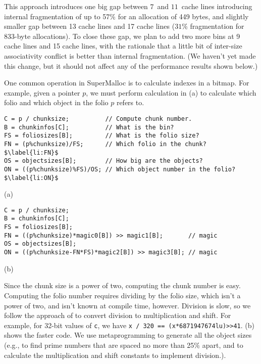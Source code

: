 \documentclass[pldi]{sigplanconf-pldi15}
\newcommand{\code}[1]{\texttt{#1}}
\begin{document}
This approach introduces one big gap between $7$~and $11$~cache lines
introducing internal fragmentation of up to 57\% for an allocation of
449 bytes, and slightly smaller gap between 13 cache lines and 17
cache lines ($31$\% fragmentation for 833-byte allocations).  To close
these gap, we plan to add two more bins at 9 cache lines and 15 cache
lines, with the rationale that a little bit of inter-size
associativity conflict is better than internal fragmentation.  (We
haven't yet made this change, but it should not affect any of the
performance results shown below.)


One common operation in SuperMalloc is to calculate indexes in a
bitmap.  For example, given a pointer $p$, we must perform calculation
in (a) to calculate which folio and which object in
the folio $p$ refers to.

\begin{figure*}
\begin{verbatim}
C = p / chunksize;          // Compute chunk number.
B = chunkinfos[C];          // What is the bin?
FS = foliosizes[B];         // What is the folio size?
FN = (p%chunksize)/FS;      // Which folio in the chunk?$\label{li:FN}$
OS = objectsizes[B];        // How big are the objects?
ON = ((p%chunksize)%FS)/OS; // Which object number in the folio?$\label{li:ON}$
\end{verbatim}
\begin{center}
(a)
\end{center}
\begin{verbatim}
C = p / chunksize;
B = chunkinfos[C];
FS = foliosizes[B];
FN = ((p%chunksize)*magic0[B]) >> magic1[B];       // magic
OS = objectsizes[B];
ON = ((p%chunksize-FN*FS)*magic2[B]) >> magic3[B]; // magic
\end{verbatim}
\begin{center}
(b)
\end{center}
\caption{The calculation to compute the folio number in the chunk,
  \code{FN}, and the object number in the folio \code{ON}, so that the
  bitmap for the free objects in the folio can be updated.  (a) shows
  the code with expensive divisions in .  (b) shows
  the code with the divisions replaced by multiplication and shift.}
\label{fig:bitindex}
\end{figure*}


Since the chunk size is a power of two, computing the chunk number is
easy.  Computing the folio number requires dividing by the folio size,
which isn't a power of two, and isn't known at compile time, however.
Division is slow, so we follow the approach of
\cite{MagenheimerPePe87} to convert division to multiplication and
shift.  For example, for 32-bit values of \code{c}, we have
\texttt{x / 320 == (x*6871947674lu)>>41}.  (b)
shows the faster code.  We use metaprogramming to generate all the
object sizes (e.g., to find prime numbers that are spaced no more than
25\% apart, and to calculate the multiplication and shift constants to
implement division.).
\end{document}
